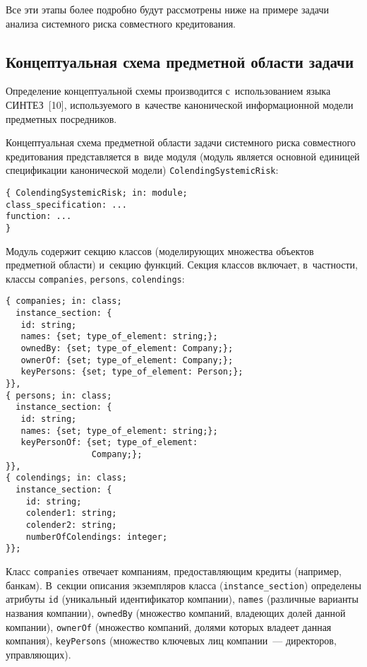 \begin{multicols}{2}
      Все эти этапы более подробно будут рассмотрены ниже на примере 
задачи анализа системного риска совместного кредитования.

\vspace*{-4pt}

\subsection{Концептуальная схема предметной области задачи}

\vspace*{-2pt}
      
      Определение концептуальной схемы производится с~использованием 
языка СИНТЕЗ~[10], используемого в~качестве канонической информационной 
модели предметных посредников. 
      
      Концептуальная схема предметной области задачи системного риска 
совместного кредитования представляется в~виде модуля (модуль является 
основной единицей спецификации канонической модели) 
\verb"ColendingSystemicRisk":
\begin{verbatim}
{ ColendingSystemicRisk; in: module;
class_specification: ...
function: ...
}
\end{verbatim}

      Модуль содержит секцию классов (моделирующих множества объектов 
предметной области) и~секцию функций. Секция классов включает, 
в~частности, классы \verb"companies", \verb"persons", \verb"colendings":
    {\small \begin{verbatim}
{ companies; in: class;
  instance_section: {
   id: string;
   names: {set; type_of_element: string;};
   ownedBy: {set; type_of_element: Company;};
   ownerOf: {set; type_of_element: Company;};
   keyPersons: {set; type_of_element: Person;};
}},
{ persons; in: class;
  instance_section: {
   id: string;
   names: {set; type_of_element: string;};
   keyPersonOf: {set; type_of_element: 
                 Company;};
}},
{ colendings; in: class;
  instance_section: {
    id: string;
    colender1: string;
    colender2: string;
    numberOfColendings: integer;
}};
\end{verbatim}
}

\vspace*{-4pt}

      Класс \verb"companies" отвечает компаниям, предо\-став\-ляющим кредиты 
(например, банкам). В~секции описания экземпляров класса 
(\verb"instance_section") определены атрибуты \verb"id" (уникальный 
идентификатор компании), \verb"names" (различные варианты названия 
компании), \verb"ownedBy" (множество компаний, владеющих долей данной 
компании), \verb"ownerOf" (множество компаний, долями которых владеет 
данная компания), \verb"keyPersons" (множество ключевых лиц компании~--- 
директоров, управляющих).
      

\end{multicols}
